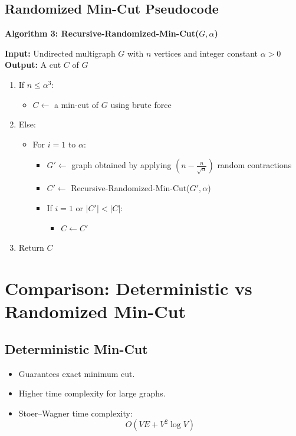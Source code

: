 \documentclass[12pt]{article}
\begin{document}
\subsection{Randomized Min-Cut Pseudocode}

\textbf{Algorithm 3: Recursive-Randomized-Min-Cut($G,\alpha$)}

\textbf{Input:} Undirected multigraph $G$ with $n$ vertices and integer constant $\alpha>0$\\
\textbf{Output:} A cut $C$ of $G$

\begin{enumerate}
    \item If $n \le \alpha^3$:
    \begin{itemize}
        \item $C \gets$ a min-cut of $G$ using brute force
    \end{itemize}
    \item Else:
    \begin{itemize}
        \item For $i=1$ to $\alpha$:
        \begin{itemize}
            \item $G' \gets$ graph obtained by applying 
            $\left(n-\frac{n}{\sqrt{\alpha}}\right)$ random contractions
            \item $C' \gets$ Recursive-Randomized-Min-Cut($G',\alpha$)
            \item If $i=1$ or $|C'|<|C|$:
            \begin{itemize}
                \item $C \gets C'$
            \end{itemize}
        \end{itemize}
    \end{itemize}
    \item Return $C$
\end{enumerate}

\section{Comparison: Deterministic vs Randomized Min-Cut}

\subsection*{Deterministic Min-Cut}
\begin{itemize}
    \item Guarantees exact minimum cut.
    \item Higher time complexity for large graphs.
    \item Stoer--Wagner time complexity:
    \[
    O(VE + V^2 \log V)
    \]
\end{itemize}
\end{document}
